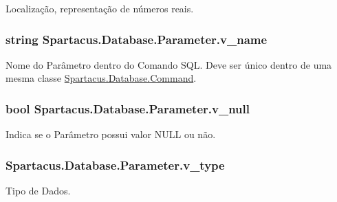 Localização, representação de números reais. 

\hypertarget{classSpartacus_1_1Database_1_1Parameter_a5bea1044f316cf4507de807026b1599a}{
\subsubsection[{v\+\_\+name}]{\setlength{\rightskip}{0pt plus 5cm}string Spartacus.\+Database.\+Parameter.\+v\+\_\+name}}\label{classSpartacus_1_1Database_1_1Parameter_a5bea1044f316cf4507de807026b1599a}


Nome do Parâmetro dentro do Comando S\+Q\+L. Deve ser único dentro de uma mesma classe \hyperlink{classSpartacus_1_1Database_1_1Command}{Spartacus.\+Database.\+Command}. 

\hypertarget{classSpartacus_1_1Database_1_1Parameter_af422ee9e94e89ad0994b6ac2de2833ba}{
\subsubsection[{v\+\_\+null}]{\setlength{\rightskip}{0pt plus 5cm}bool Spartacus.\+Database.\+Parameter.\+v\+\_\+null}}\label{classSpartacus_1_1Database_1_1Parameter_af422ee9e94e89ad0994b6ac2de2833ba}


Indica se o Parâmetro possui valor N\+U\+L\+L ou não. 

\hypertarget{classSpartacus_1_1Database_1_1Parameter_a0185e9a5eb61471aed6a5fe31f7fdac6}{
\subsubsection[{v\+\_\+type}]{ Spartacus.\+Database.\+Parameter.\+v\+\_\+type}}\label{classSpartacus_1_1Database_1_1Parameter_a0185e9a5eb61471aed6a5fe31f7fdac6}


Tipo de Dados. 

